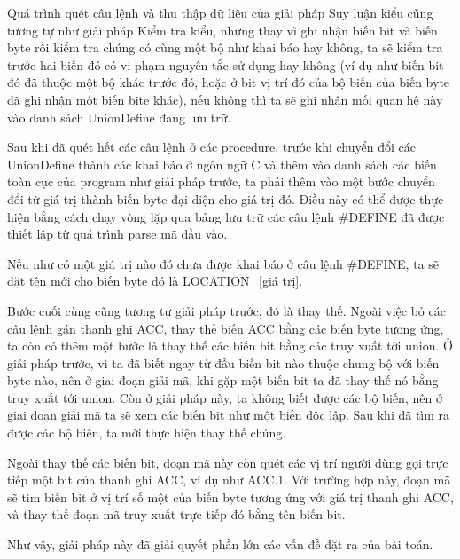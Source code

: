 
Quá trình quét câu lệnh và thu thập dữ liệu của giải pháp Suy luận kiểu cũng tương tự như giải pháp Kiểm tra kiểu, nhưng thay vì ghi nhận biến bit và biến byte rồi kiểm tra chúng có cùng một bộ như khai báo hay không, ta sẽ kiểm tra trước hai biến đó có vi phạm nguyên tắc sử dụng hay không (ví dụ như biến bit đó đã thuộc một bộ khác trước đó, hoặc ở bit vị trí đó của bộ biến của biến byte đã ghi nhận một biến bite khác), nếu không thì ta sẽ ghi nhận mối quan hệ này vào danh sách UnionDefine đang lưu trữ.


Sau khi đã quét hết các câu lệnh ở các procedure, trước khi chuyển đổi các UnionDefine thành các khai báo ở ngôn ngữ C và thêm vào danh sách các biến toàn cục của program như giải pháp trước, ta phải thêm vào một bước chuyển đổi từ giá trị thành biến byte đại diện cho giá trị đó. Điều này có thể được thực hiện bằng cách chạy vòng lặp qua bảng lưu trữ các câu lệnh \#DEFINE đã được thiết lập từ quá trình parse mã đầu vào.


Nếu như có một giá trị nào đó chưa được khai báo ở câu lệnh \#DEFINE, ta sẽ đặt tên mới cho biến byte đó là LOCATION\_[giá trị].


Bước cuối cùng cũng tương tự giải pháp trước, đó là thay thế. Ngoài việc bỏ các câu lệnh gán thanh ghi ACC, thay thế biến ACC bằng các biến byte tương ứng, ta còn có thêm một bước là thay thế các biến bit bằng các truy xuất tới union. Ở giải pháp trước, vì ta đã biết ngay từ đầu biến bit nào thuộc chung bộ với biến byte nào, nên ở giai đoạn giải mã, khi gặp một biến bit ta đã thay thế nó bằng truy xuất tới union. Còn ở giải pháp này, ta không biết được các bộ biến, nên ở giai đoạn giải mã ta sẽ xem các biến bit như một biến độc lập. Sau khi đã tìm ra được các bộ biến, ta mới thực hiện thay thế chúng.


Ngoài thay thế các biến bit, đoạn mã này còn quét các vị trí người dùng gọi trực tiếp một bit của thanh ghi ACC, ví dụ như ACC.1. Với trường hợp này, đoạn mã sẽ tìm biến bit ở vị trí số một của biến byte tương ứng với giá trị thanh ghi ACC, và thay thế đoạn mã truy xuất trực tiếp đó bằng tên biến bit. 


Như vậy, giải pháp này đã giải quyết phần lớn các vấn đề đặt ra của bài toán. 

